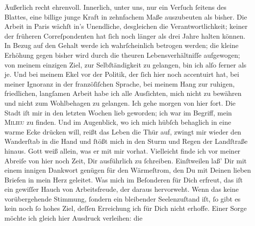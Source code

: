\begin{ledgroupsized}[t]{13cm}
               Äußerlich recht ehrenvoll. Innerlich, unter uns, nur ein Verſuch ſeitens des Blattes, eine billige junge
               Kraft in zehnfachem Maße auszubeuten als bisher. Die Arbeit in Paris wächſt in’s Unendliche, desgleichen die
               Verantwortlichkeit; keiner der früheren Correſpondenten {\pb}hat ſich noch länger als drei Jahre halten können.
               In Bezug auf den Gehalt werde ich wahrſcheinlich betrogen werden; die kleine Erhöhung
               gegen bisher wird durch die theuren Lebensverhältniſſe aufgewogen; von meinem
               einzigen Ziel, zur Selbſtändigkeit zu  gelangen, bin ich alſo ferner als je. Und bei meinem Ekel vor der Politik, der
               ſich hier noch  accentuirt hat, bei meiner Ignoranz
               in der franzöſiſchen Sprache, bei meinem Hang zur ruhigen, \strikeout{\textcolor{gray}{ſt}} friedlichen, langſamen Arbeit habe ich alle Ausſichten, mich nicht zu bewähren
               und nicht zum Wohlbehagen zu gelangen. Ich gehe morgen
               von hier fort. Die Stadt iſt
               mir in den letzten Wochen lieb geworden; ich war im Begriff, mein \textsc{Milieu} zu finden. Und im Augenblick, wo ich mich hübſch
               behaglich in eine warme Ecke drücken will, {\pb} reißt das Leben die Thür auf, zwingt mir wieder
               den Wanderſtab  in die Hand und ſtößt mich in
               den Sturm und Regen der Landſtraße hinaus. Gott weiß allein, was er mit mir
               vorhat.\pend
           \pstart
           Vielleicht finde ich vor meiner Abreiſe von hier noch Zeit, Dir ausführlich zu
               ſchreiben. Einſtweilen laß’ Dir mit einem innigen Dankwort genügen für den
               Wärmeſtrom, den Du mit Deinen lieben Briefen in mein Herz geleitet. Was mich im
               Beſonderen für Dich erfreut, das iſt ein gewiſſer Hauch von Arbeitsfreude, der daraus
               hervorweht. Wenn das keine vorübergehende Stimmung, ſondern ein bleibender
               Seelenzuſtand iſt, ſo gibt es kein noch ſo hohes Ziel, deſſen Erreichung ich für Dich
               nicht erhoffe. Einer Sorge möchte ich gleich hier Ausdruck verleihen:  die \label{K_L02670-1v}
\end{ledgroupsized}
